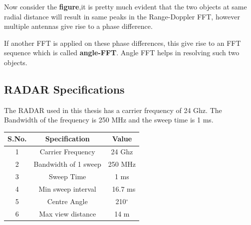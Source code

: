 Now consider the \textbf{figure},it is pretty much evident that the two objects at same radial distance will result in same peaks in the Range-Doppler FFT, however multiple antennas give rise to a phase difference.




If another FFT is applied on these phase differences, this give rise to an FFT sequence which is called \textbf{angle-FFT}. Angle FFT helps in resolving such two objects.




\subsection{RADAR Specifications}
The RADAR used in this thesis has a carrier frequency of 24 Ghz. The Bandwidth of the frequency is 250 MHz and the sweep time is 1 ms.

\begin{center}
\begin{tabular}{ |c|c|c| }
\hline
 S.No. & Specification & Value \\ 
 \hline
1 &	Carrier Frequency	& 24 Ghz \\
2	& Bandwidth of 1 sweep	& 250 MHz\\
3 &	Sweep Time	& 1 ms\\
4 &	Min sweep interval	& ~16.7 ms\\
5 &	Centre Angle & 210$^{\circ}$  \\
6 &	Max view distance &	14 m \\
 \hline
\end{tabular}
\end{center}

		




